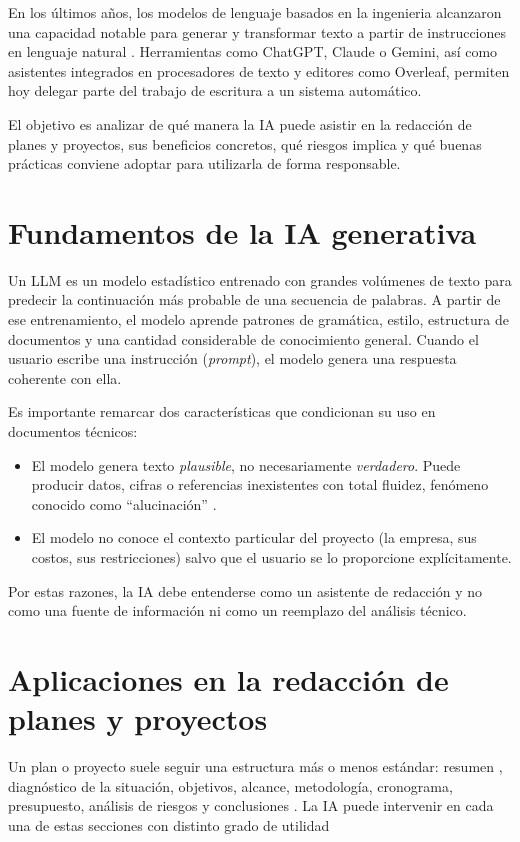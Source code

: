 \documentclass[runningheads]{llncs}
\begin{document}
En los últimos años, los modelos de lenguaje basados en la ingenieria  alcanzaron una capacidad notable para generar y transformar texto a partir de instrucciones en lenguaje natural . Herramientas como ChatGPT, Claude o Gemini, así como asistentes integrados en procesadores de texto y editores como Overleaf, permiten hoy delegar parte del trabajo de escritura a un sistema automático.

El objetivo es analizar de qué manera la IA puede asistir en la redacción de planes y proyectos,  sus beneficios concretos, qué riesgos implica y qué buenas prácticas conviene adoptar para utilizarla de forma responsable.

\section{Fundamentos de la IA generativa}

Un LLM es un modelo estadístico entrenado con grandes volúmenes de texto para predecir la continuación más probable de una secuencia de palabras. A partir de ese entrenamiento, el modelo aprende patrones de gramática, estilo, estructura de documentos y una cantidad considerable de conocimiento general. Cuando el usuario escribe una instrucción (\emph{prompt}), el modelo genera una respuesta coherente con ella.

Es importante remarcar dos características que condicionan su uso en documentos técnicos:

\begin{itemize}
\item El modelo genera texto \emph{plausible}, no necesariamente \emph{verdadero}. Puede producir datos, cifras o referencias inexistentes con total fluidez, fenómeno conocido como ``alucinación'' \cite{ji2023}.
\item El modelo no conoce el contexto particular del proyecto (la empresa, sus costos, sus restricciones) salvo que el usuario se lo proporcione explícitamente.
\end{itemize}

Por estas razones, la IA debe entenderse como un asistente de redacción y no como una fuente de información ni como un reemplazo del análisis técnico.

\section{Aplicaciones en la redacción de planes y proyectos}

Un plan o proyecto suele seguir una estructura más o menos estándar: resumen , diagnóstico de la situación, objetivos, alcance, metodología, cronograma, presupuesto, análisis de riesgos y conclusiones . La IA puede intervenir en cada una de estas secciones con distinto grado de utilidad
\end{document}
